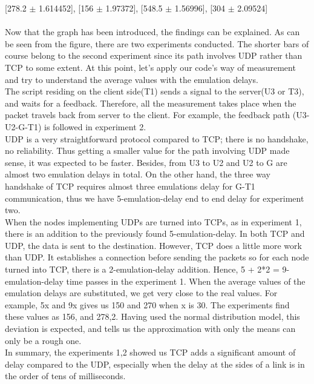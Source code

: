 \documentclass[12pt]{article}
\begin{document}
[278.2 $\pm$ 1.614452], [156 $\pm$ 1.97372], [548.5 $\pm$ 1.56996], [304 $\pm$ 2.09524]
\\\\

Now that the graph has been introduced, the findings can be explained.
As can be seen from the figure, there are two experiments conducted.
The shorter bars of course belong to the second experiment since its path involves UDP rather than TCP to some extent. At this point, let's apply our code's way of measurement and try to understand the average values with the emulation delays.
\\

The script residing on the client side(T1) sends a signal to the server(U3 or T3), and waits for a feedback. Therefore, all the measurement takes place when the packet travels back from server to the client. For example, the feedback path (U3-U2-G-T1) is followed in experiment 2.
\\

UDP is a very straightforward protocol compared to TCP; there is no handshake, no reliability. Thus getting a smaller value for the path involving UDP made sense, it was expected to be faster. Besides, from U3 to U2 and U2 to G are almost two emulation delays in total. On the other hand, the three way handshake of TCP requires almost three emulations delay for G-T1 communication, thus we have 5-emulation-delay end to end delay for experiment two.
\\

When the nodes implementing UDPs are turned into TCPs, as in experiment 1, there is an addition to the previously found 5-emulation-delay. In both TCP and UDP, the data is sent to the destination. However, TCP does a little more work than UDP. It establishes a connection before sending the packets so for each node turned into TCP, there is a 2-emulation-delay addition. Hence, 5 + 2*2 = 9-emulation-delay time passes in the experiment 1. When the average values of the emulation delays are substituted, we get very close to the real values. For example, 5x and 9x gives us 150 and 270 when x is 30. The experiments find these values as 156, and 278,2. Having used the normal distribution model, this deviation is expected, and tells us the approximation with only the means can only be a rough one.
\\

In summary, the experiments 1,2 showed us TCP adds a significant amount of delay compared to the UDP, especially when the delay at the sides of a link is in the order of tens of milliseconds.\\
\end{document}
